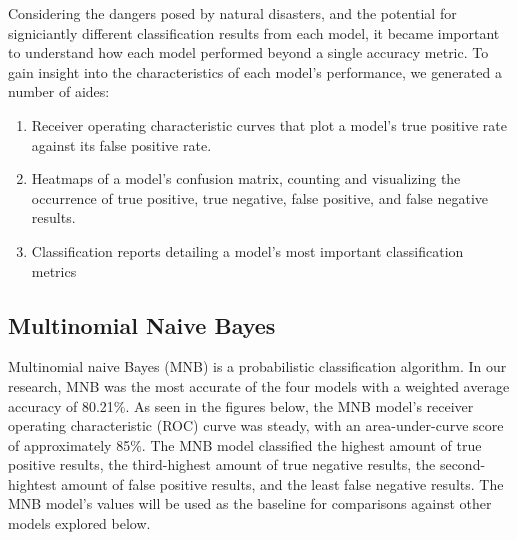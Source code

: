 \documentclass[11pt]{article}
\begin{document}
Considering the dangers posed by natural disasters, and the potential for signiciantly different classification results from each model, it became important to understand how each model performed beyond a single accuracy metric. To gain insight into the characteristics of each model's performance, we generated a number of aides:
\begin{enumerate}
  \item Receiver operating characteristic curves that plot a model's true positive rate against its false positive rate.
  \item Heatmaps of a model's confusion matrix, counting and visualizing the occurrence of true positive, true negative, false positive, and false negative results.
  \item Classification reports detailing a model's most important classification metrics
\end{enumerate}

\bigskip\bigskip


\subsection{Multinomial Naive Bayes}

Multinomial naive Bayes (MNB) is a probabilistic classification algorithm. In our research, MNB was the most accurate of the four models with a weighted average accuracy of 80.21\%. As seen in the figures below, the MNB model's receiver operating characteristic (ROC) curve was steady, with an area-under-curve score of approximately 85\%. The MNB model classified the highest amount of true positive results, the third-highest amount of true negative results, the second-hightest amount of false positive results, and the least false negative results. The MNB model's values will be used as the baseline for comparisons against other models explored below.
\end{document}
